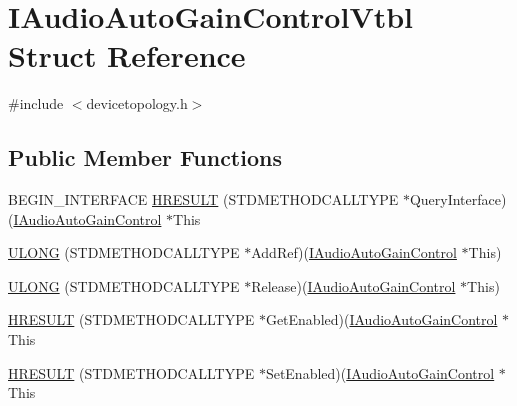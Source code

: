 \hypertarget{struct_i_audio_auto_gain_control_vtbl}{}\section{I\+Audio\+Auto\+Gain\+Control\+Vtbl Struct Reference}
\label{struct_i_audio_auto_gain_control_vtbl}


{\ttfamily \#include $<$devicetopology.\+h$>$}

\subsection*{Public Member Functions}
\begin{DoxyCompactItemize}
\item 
B\+E\+G\+I\+N\+\_\+\+I\+N\+T\+E\+R\+F\+A\+CE \hyperlink{struct_i_audio_auto_gain_control_vtbl_a04863dc3bdf2f96c01d097787d727f1b}{H\+R\+E\+S\+U\+LT} (S\+T\+D\+M\+E\+T\+H\+O\+D\+C\+A\+L\+L\+T\+Y\+PE $\ast$Query\+Interface)(\hyperlink{devicetopology_8h_ae5cebecc60b40ff75cabb4905dc6c71d}{I\+Audio\+Auto\+Gain\+Control} $\ast$This
\item 
\hyperlink{struct_i_audio_auto_gain_control_vtbl_a329aab179d5ab963502a8b698d8e3e07}{U\+L\+O\+NG} (S\+T\+D\+M\+E\+T\+H\+O\+D\+C\+A\+L\+L\+T\+Y\+PE $\ast$Add\+Ref)(\hyperlink{devicetopology_8h_ae5cebecc60b40ff75cabb4905dc6c71d}{I\+Audio\+Auto\+Gain\+Control} $\ast$This)
\item 
\hyperlink{struct_i_audio_auto_gain_control_vtbl_a6da53c8695bd720c556e878b40015ca7}{U\+L\+O\+NG} (S\+T\+D\+M\+E\+T\+H\+O\+D\+C\+A\+L\+L\+T\+Y\+PE $\ast$Release)(\hyperlink{devicetopology_8h_ae5cebecc60b40ff75cabb4905dc6c71d}{I\+Audio\+Auto\+Gain\+Control} $\ast$This)
\item 
\hyperlink{struct_i_audio_auto_gain_control_vtbl_a7e26ffc5e1868906348dfe1eda8f080c}{H\+R\+E\+S\+U\+LT} (S\+T\+D\+M\+E\+T\+H\+O\+D\+C\+A\+L\+L\+T\+Y\+PE $\ast$Get\+Enabled)(\hyperlink{devicetopology_8h_ae5cebecc60b40ff75cabb4905dc6c71d}{I\+Audio\+Auto\+Gain\+Control} $\ast$This
\item 
\hyperlink{struct_i_audio_auto_gain_control_vtbl_a375381f01f04b74e9822c38b1243f2dd}{H\+R\+E\+S\+U\+LT} (S\+T\+D\+M\+E\+T\+H\+O\+D\+C\+A\+L\+L\+T\+Y\+PE $\ast$Set\+Enabled)(\hyperlink{devicetopology_8h_ae5cebecc60b40ff75cabb4905dc6c71d}{I\+Audio\+Auto\+Gain\+Control} $\ast$This
\end{DoxyCompactItemize}
